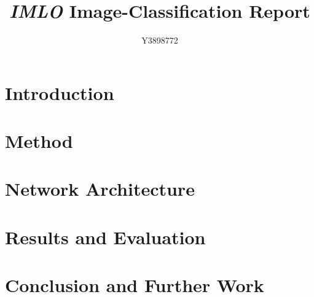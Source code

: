 \documentclass[journal]{IEEEtran}
\title{\emph{IMLO} Image-Classification Report}
\author{Y3898772}
\begin{document}
\maketitle
\begin{abstract}
    \cite{IEEEexample:articlelargepages}
\end{abstract}
\section{Introduction}
\section{Method}
\section{Network Architecture}
\section{Results and Evaluation}
\section{Conclusion and Further Work}


\end{document}
